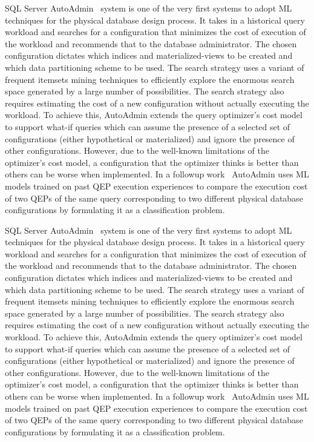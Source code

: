 SQL Server AutoAdmin~\cite{autoadmin} system is one of the very first systems to adopt ML techniques for the physical database design process.
It takes in a historical query workload and searches for a configuration that minimizes the cost of execution of the workload and recommends that to the database administrator.
The chosen configuration dictates which indices and materialized-views to be created and which data partitioning scheme to be used.
The search strategy uses a variant of frequent itemsets mining techniques to efficiently explore the enormous search space generated by a large number of possibilities.
The search strategy also requires estimating the cost of a new configuration without actually executing the workload.
To achieve this, AutoAdmin extends the query optimizer's cost model to support what-if queries which can assume the presence of a selected set of configurations (either hypothetical or materialized) and ignore the presence of other configurations.
However, due to the well-known limitations of the optimizer's cost model, a configuration that the optimizer thinks is better than others can be worse when implemented.
In a followup work~\cite{autoadmin_2,} AutoAdmin uses ML models trained on past QEP execution experiences to compare the execution cost of two QEPs of the same query corresponding to two different physical database configurations by formulating it as a classification problem.

SQL Server AutoAdmin~\cite{autoadmin} system is one of the very first systems to adopt ML techniques for the physical database design process.
It takes in a historical query workload and searches for a configuration that minimizes the cost of execution of the workload and recommends that to the database administrator.
The chosen configuration dictates which indices and materialized-views to be created and which data partitioning scheme to be used.
The search strategy uses a variant of frequent itemsets mining techniques to efficiently explore the enormous search space generated by a large number of possibilities.
The search strategy also requires estimating the cost of a new configuration without actually executing the workload.
To achieve this, AutoAdmin extends the query optimizer's cost model to support what-if queries which can assume the presence of a selected set of configurations (either hypothetical or materialized) and ignore the presence of other configurations.
However, due to the well-known limitations of the optimizer's cost model, a configuration that the optimizer thinks is better than others can be worse when implemented.
In a followup work~\cite{autoadmin_2,} AutoAdmin uses ML models trained on past QEP execution experiences to compare the execution cost of two QEPs of the same query corresponding to two different physical database configurations by formulating it as a classification problem.

